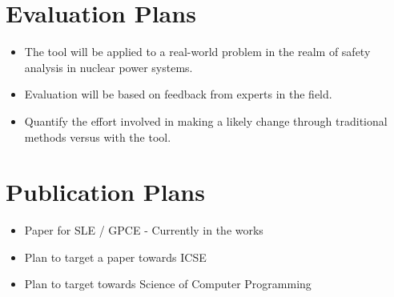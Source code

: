 \documentclass[11pt]{article} %
\begin{document}
\section{Evaluation Plans}
\begin{itemize}
	\item The tool will be applied to a real-world problem in the realm of safety
					analysis in nuclear power systems.
	\item Evaluation will be based on feedback from experts in the field.
	\item Quantify the effort involved in making a likely change through
					traditional methods versus with the tool.
\end{itemize}

\section{Publication Plans}
\begin{itemize}
	\item Paper for SLE / GPCE - Currently in the works
	\item Plan to target a paper towards ICSE
	\item Plan to target towards Science of Computer Programming
\end{itemize}
\end{document}
